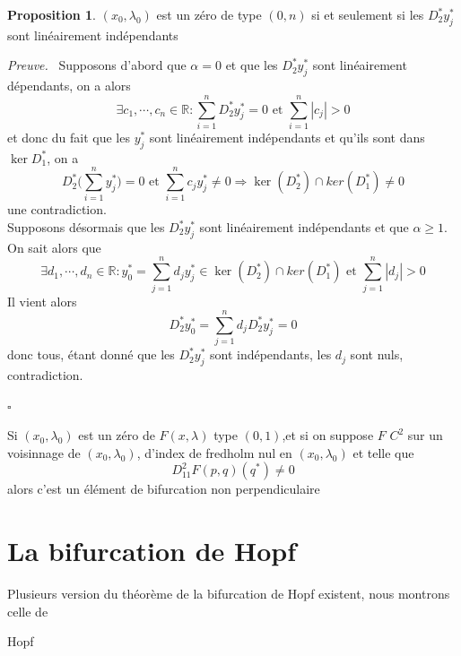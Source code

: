 \documentclass[a4paper,12pt,oneside,titlepage]{article}
\newcommand{\R}[0]{\mathbb{R}}
\theoremstyle{definition}
\newtheorem{proposition}[definition]{Proposition}
\theoremstyle{plain}
\newenvironment{preuve}
{\par\noindent\textit{Preuve.}\ }
{\hfill$\square$\par}
\begin{document}
\begin{proposition}
    $(x_0,\lambda_0)$ est un zéro de type $(0,n)$ si et seulement si les $D_2^{*}y_j^{*}$ sont linéairement indépendants
\end{proposition}
\begin{preuve}
    Supposons d'abord que $\alpha=0$ et que les $D_2^{*}y_j^{*}$ sont linéairement dépendants,
    on a alors 
    \begin{equation*}
        \exists c_1,\cdots,c_n\in\R: \sum_{i=1}^n D_2^{*}y_j^{*}=0\text{ et } \sum_{i=1}^n |c_j|>0
    \end{equation*}
    et donc du fait que les $y^{*}_j$ sont linéairement indépendants et qu'ils sont dans $\ker D_1^{*}$, on  a 
    \begin{equation*}
        D_2^{*} \Bigg(\sum_{i=1}^n y_j^{*}
        \Bigg)=0\text{ et } \sum_{i=1}^n c_jy_j^{*}\neq 
        0\Rightarrow  \ker (D_2^{*})\cap ker 
        (D_1^{*})\neq {0}
    \end{equation*}
    une contradiction.\\
    Supposons désormais que les 
    $D_2^{*}y_j^{*}$ sont linéairement indépendants et que $\alpha\geq 1$. On sait alors que 
    \begin{equation*}
    \exists d_1,\cdots,d_n\in\R:
    y^{*}_0=\sum_{j=1}^n d_j y^{*}_j\in\ker (D_2^{*})
    \cap ker (D_1^{*})\text{ et } \sum_{j=1}^n |
    d_j|>0
    \end{equation*}
    Il vient alors
    \begin{equation*}
        D_2^{*}y^{*}_0=\sum_ {j=1}^n d_jD_2^{*}  y^{*}_j=0
    \end{equation*} 
    donc tous, étant donné que les  $D_2^{*}  y^{*}_j$ sont indépendants, les $d_j$ sont nuls, contradiction.

\end{preuve}

\begin{theobox}{}{}
    Si $(x_0,\lambda_0)$ est un zéro de $F(x,\lambda)$ type $(0,1)$,et si on suppose $F$ $C^2$ sur un voisinnage de $(x_0,\lambda_0)$, d'index de fredholm nul en $(x_0,\lambda_0)$ et telle que
    \begin{equation*}
        D^2_{11}F(p,q)(q^{*})\neq 0
    \end{equation*}
    alors c'est un élément de bifurcation non perpendiculaire
\end{theobox}
\section{La bifurcation de Hopf}
Plusieurs version du théorème de la bifurcation de Hopf existent, nous montrons celle de \cite{Kawanago2023HopfBanach}
\begin{theobox}{Hopf}{}
    
\end{theobox}
\end{document}
